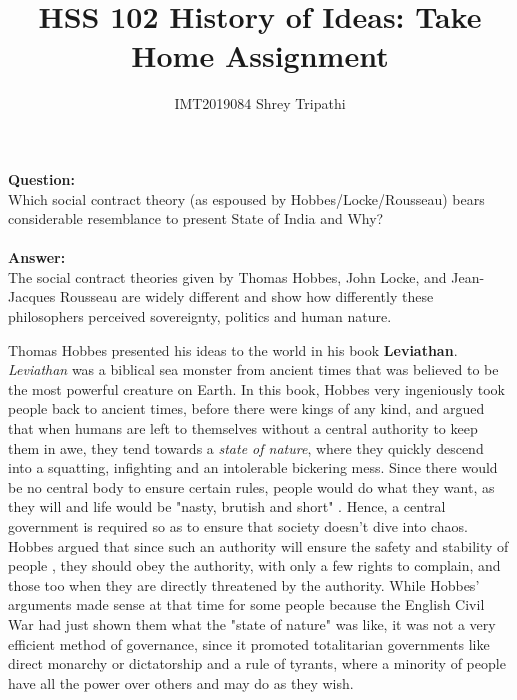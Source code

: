 \documentclass[12pt]{article}
\title{HSS 102 History of Ideas: Take Home Assignment}
\author{IMT2019084 Shrey Tripathi}
\begin{document}
\maketitle

\textbf{Question:}\\
Which social contract theory (as espoused by Hobbes/Locke/Rousseau) bears
considerable resemblance to present State of India and Why? \\\\

\textbf{Answer:}\\
The social contract theories given by Thomas Hobbes, John Locke, and Jean-Jacques Rousseau are widely different and show how differently these philosophers perceived sovereignty, politics and human nature. 

Thomas Hobbes presented his ideas to the world in his book \textbf{Leviathan}. \textit{Leviathan} was a biblical sea monster from ancient times that was believed to be the most powerful creature on Earth. In this book, Hobbes very ingeniously took people back to ancient times, before there were kings of any kind, and argued that when humans are left to themselves without a central authority to keep them in awe, they tend towards a \textit{state of nature}, where they quickly descend into a squatting, infighting and an intolerable bickering mess. Since there would be no central body to ensure certain rules, people would do what they want, as they will and life would be "nasty, brutish and short" \cite{hobbes} \cite[Ch.\ 8]{leviathan} \cite{hobbespod}. Hence, a central government is required so as to ensure that society doesn't dive into chaos. Hobbes argued that since such an authority will ensure the safety and stability of people \cite{philosophy}, they should obey the authority, with only a few rights to complain, and those too when they are directly threatened by the authority. 
While Hobbes' arguments made sense at that time for some people because the English Civil War had just shown them what the "state of nature" was like, it was not a very efficient method of governance, since it promoted totalitarian governments like direct monarchy or dictatorship and a rule of tyrants, where a minority of people have all the power over others and may do as they wish.
\end{document}
